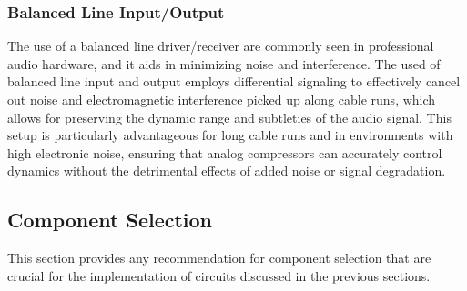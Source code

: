 \documentclass[10pt]{article}
\begin{document}
\begin{multicols*}{2}
\begin{minipage}{\linewidth}

                        \label{fig:pwr-mng}

                    \end{minipage}

                \subsubsection{Balanced Line Input/Output}
                    The use of a balanced line driver/receiver are commonly seen in professional audio hardware, and it aids in minimizing noise and interference. The used of balanced line input and output employs differential signaling to effectively cancel out noise and electromagnetic interference picked up along cable runs, which allows  for preserving the dynamic range and subtleties of the audio signal. This setup is particularly advantageous for long cable runs and in environments with high electronic noise, ensuring that analog compressors can accurately control dynamics without the detrimental effects of added noise or signal degradation.\par

            \subsection{Component Selection}
                This section provides any recommendation for component selection that are crucial for the implementation of circuits discussed in the previous sections.
                

\end{multicols*}
\end{document}
